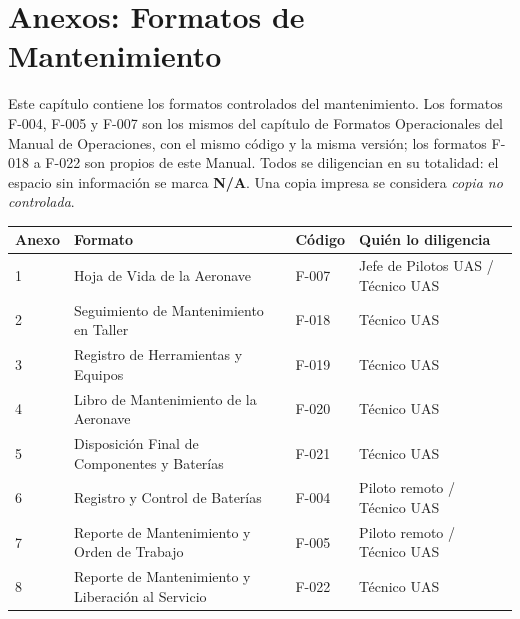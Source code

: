 \chapter{Anexos: Formatos de Mantenimiento}
\label{chap:anexos}
\label{inicio_anexos}
Este capítulo contiene los formatos controlados del mantenimiento. Los formatos F-004, F-005 y F-007 son los mismos del capítulo de Formatos Operacionales del Manual de Operaciones, con el mismo código y la misma versión; los formatos F-018 a F-022 son propios de este Manual. Todos se diligencian en su totalidad: el espacio sin información se marca \textbf{N/A}. Una copia impresa se considera \textit{copia no controlada}.

\begin{longtable}{|p{1.6cm}|p{5.2cm}|p{1.8cm}|p{5.4cm}|}
\hline
\rowcolor[gray]{0.9}\textbf{Anexo} & \textbf{Formato} & \textbf{Código} & \textbf{Quién lo diligencia} \\ \hline
\endhead
1 & Hoja de Vida de la Aeronave & F-007 & Jefe de Pilotos UAS / Técnico UAS \\ \hline
2 & Seguimiento de Mantenimiento en Taller & F-018 & Técnico UAS \\ \hline
3 & Registro de Herramientas y Equipos & F-019 & Técnico UAS \\ \hline
4 & Libro de Mantenimiento de la Aeronave & F-020 & Técnico UAS \\ \hline
5 & Disposición Final de Componentes y Baterías & F-021 & Técnico UAS \\ \hline
6 & Registro y Control de Baterías & F-004 & Piloto remoto / Técnico UAS \\ \hline
7 & Reporte de Mantenimiento y Orden de Trabajo & F-005 & Piloto remoto / Técnico UAS \\ \hline
8 & Reporte de Mantenimiento y Liberación al Servicio & F-022 & Técnico UAS \\ \hline
\end{longtable}

